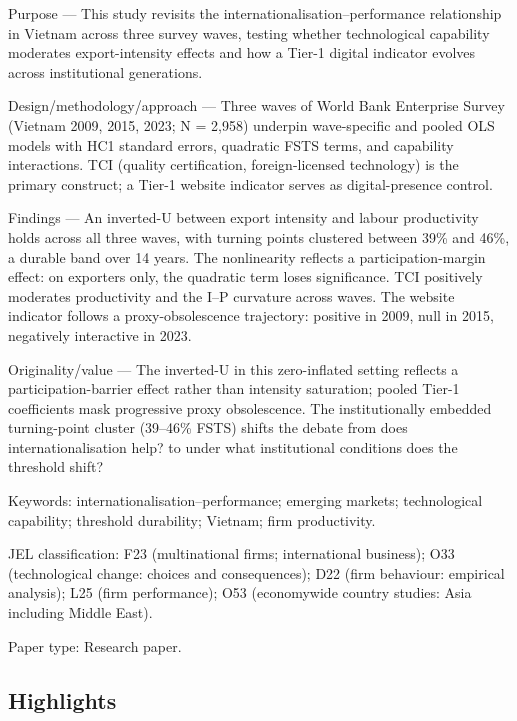 \documentclass[12pt,a4paper]{article}
\begin{document}
Purpose --- This study revisits the internationalisation--performance
relationship in Vietnam across three survey waves, testing whether
technological capability moderates export-intensity effects and how a
Tier-1 digital indicator evolves across institutional generations.

Design/methodology/approach --- Three waves of World Bank Enterprise
Survey (Vietnam 2009, 2015, 2023; N = 2,958) underpin wave-specific and
pooled OLS models with HC1 standard errors, quadratic FSTS terms, and
capability interactions. TCI (quality certification, foreign-licensed
technology) is the primary construct; a Tier-1 website indicator serves
as digital-presence control.

Findings --- An inverted-U between export intensity and labour
productivity holds across all three waves, with turning points clustered
between 39\% and 46\%, a durable band over 14 years. The nonlinearity
reflects a participation-margin effect: on exporters only, the quadratic
term loses significance. TCI positively moderates productivity and the
I--P curvature across waves. The website indicator follows a
proxy-obsolescence trajectory: positive in 2009, null in 2015,
negatively interactive in 2023.

Originality/value --- The inverted-U in this zero-inflated setting
reflects a participation-barrier effect rather than intensity
saturation; pooled Tier-1 coefficients mask progressive proxy
obsolescence. The institutionally embedded turning-point cluster
(39--46\% FSTS) shifts the debate from \textquotesingle does
internationalisation help?\textquotesingle{} to \textquotesingle under
what institutional conditions does the threshold
shift?\textquotesingle{}

Keywords: internationalisation--performance; emerging markets;
technological capability; threshold durability; Vietnam; firm
productivity.

JEL classification: F23 (multinational firms; international business);
O33 (technological change: choices and consequences); D22 (firm
behaviour: empirical analysis); L25 (firm performance); O53 (economywide
country studies: Asia including Middle East).

Paper type: Research paper.

\hypertarget{highlights}{%
\subsection{Highlights}\label{highlights}}
\end{document}
